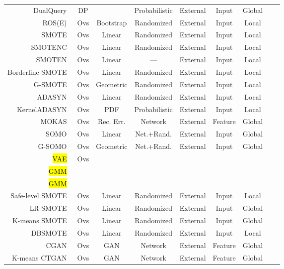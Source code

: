 \documentclass[parskip=full]{scrartcl}
\begin{document}
\begin{longtable}{rcccccccc}
    DualQuery~\cite{gaboardi2014dual} & DP &  & Probabilistic & External & Input & Global \\
    ROS(E)~\cite{menardi2014training} & Ovs & Bootstrap & Randomized & External & Input & Local \\ 
    SMOTE~\cite{chawla2002smote} & Ovs & Linear & Randomized & External & Input & Local \\
    SMOTENC~\cite{chawla2002smote} & Ovs & Linear & Randomized & External & Input & Local \\
    SMOTEN~\cite{chawla2002smote} & Ovs & Linear & --- & External & Input & Local \\
    Borderline-SMOTE~\cite{han2005borderline} & Ovs & Linear & Randomized & External & Input & Local \\
    G-SMOTE~\cite{douzas2019geometric} & Ovs & Geometric & Randomized & External & Input & Local \\
    ADASYN~\cite{he2008adasyn} & Ovs & Linear & Randomized & External & Input & Local \\
    KernelADASYN~\cite{tang2015kerneladasyn} & Ovs & PDF & Probabilistic & External & Input & Local \\
    MOKAS~\cite{lin2017minority} & Ovs & Rec. Err. & Network & External & Feature & Global \\
    SOMO~\cite{douzas2017self} & Ovs & Linear & Net.+Rand. & External & Input & Global \\
    G-SOMO~\cite{douzas2021g} & Ovs & Geometric & Net.+Rand. & External & Input & Global \\
    \hl{VAE}~\cite{dai2019generative} & Ovs \\
    \hl{GMM}~\cite{xing2022predict} \\
    \hl{GMM}~\cite{xu2022synthetic} \\
    Safe-level SMOTE~\cite{bunkhumpornpat2009safe} & Ovs & Linear & Randomized & External & Input & Local \\
    LR-SMOTE~\cite{liang2020lr} & Ovs & Linear & Randomized & External & Input & Global \\
    K-means SMOTE~\cite{douzas2018improving} & Ovs & Linear & Randomized & External & Input & Global\\
    DBSMOTE~\cite{bunkhumpornpat2012dbsmote} & Ovs & Linear & Randomized & External & Input & Local\\
    CGAN~\cite{douzas2018effective} & Ovs & GAN & Network & External & Feature & Global \\
    K-means CTGAN~\cite{an2021k} & Ovs & GAN & Network & External & Feature & Global \\

\end{longtable}
\end{document}
